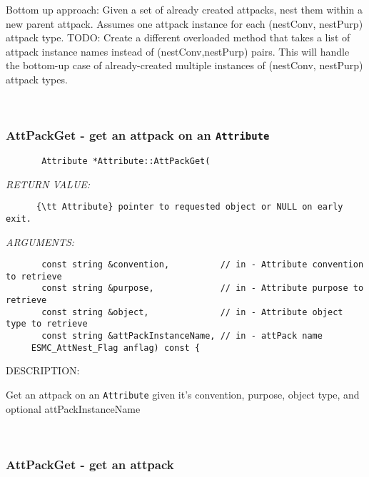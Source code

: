        Bottom up approach:  Given a set of already created attpacks, nest them
       within a new parent attpack.  Assumes one attpack instance for each
       (nestConv, nestPurp) attpack type.
       TODO:  Create a different overloaded method that takes a list of 
              attpack instance names instead of (nestConv,nestPurp) pairs.
              This will handle the bottom-up case of already-created multiple
              instances of (nestConv, nestPurp) attpack types.
   
 
\mbox{}\hrulefill\
 
\subsubsection [AttPackGet] {AttPackGet - get an attpack on an {\tt Attribute}}


  
\begin{verbatim}       Attribute *Attribute::AttPackGet(
   \end{verbatim}{\em RETURN VALUE:}
\begin{verbatim}      {\tt Attribute} pointer to requested object or NULL on early exit.
   \end{verbatim}{\em ARGUMENTS:}
\begin{verbatim}       const string &convention,          // in - Attribute convention to retrieve
       const string &purpose,             // in - Attribute purpose to retrieve
       const string &object,              // in - Attribute object type to retrieve
       const string &attPackInstanceName, // in - attPack name
     ESMC_AttNest_Flag anflag) const {
 \end{verbatim}
{\sf DESCRIPTION:\\ }


      Get an attpack on an {\tt Attribute} given it's convention, 
      purpose, object type, and optional attPackInstanceName
   
 
\mbox{}\hrulefill\
 
\subsubsection [AttPackGet] {AttPackGet - get an attpack}


